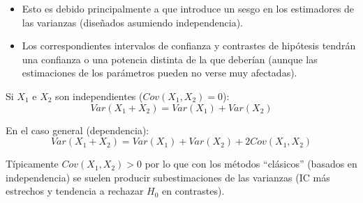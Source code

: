 \documentclass[
  10pt,
]{book}
\theoremstyle{break}
\theoremstyle{nonumberplain}
\begin{document}
\begin{itemize}
\item
  Esto es debido principalmente a que introduce un sesgo en los
  estimadores de las varianzas (diseñados asumiendo independencia).
\item
  Los correspondientes intervalos de confianza y
  contrastes de hipótesis tendrán una confianza o una potencia
  distinta de la que deberían (aunque las estimaciones de los parámetros
  pueden no verse muy afectadas).
\end{itemize}

Si \(X_{1}\) e \(X_{2}\) son independientes (\(Cov(X_{1},X_{2})=0\)):
\[Var(X_{1}+X_{2})=Var(X_{1})+Var(X_{2})\]

En el caso general (dependencia):
\[Var(X_{1}+X_{2})=Var(X_{1})+Var(X_{2})+2Cov(X_{1},X_{2})\]

Típicamente \(Cov(X_{1},X_{2})>0\) por lo que con los métodos ``clásicos'' (basados en independencia) se suelen producir subestimaciones de las varianzas (IC más estrechos y tendencia a rechazar \(H_0\) en contrastes).
\end{document}
